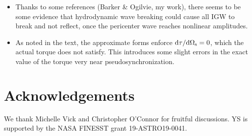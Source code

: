 \documentclass[
        fleqn,
        usenatbib,
    ]{mnras}
\newcommand*{\rdil}[2]{\mathrm{d}#1 / \mathrm{d}#2}
\begin{document}
\begin{itemize}
    \item Thanks to some references (Barker \& Ogilvie, my work), there seems to
        be some evidence that hydrodynamic wave breaking could cause all IGW to
        break and not reflect, once the pericenter wave reaches nonlinear
        amplitudes.

    \item As noted in the text, the approximate forms enforce
        $\rdil{\tau}{\Omega_{\rm s}} = 0$, which the actual torque does not satisfy.
        This introduces some slight errors in the exact value of the torque very
        near pseudosynchronization.
\end{itemize}

\section{Acknowledgements}

We thank Michelle Vick and Christopher O'Connor for fruitful discussions. YS is
supported by the NASA FINESST grant 19-ASTRO19-0041.%





\bsp
\label{lastpage} %
\end{document}
